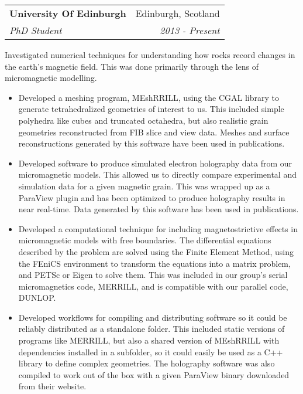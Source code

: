 \documentclass[11pt]{article}
\makeatletter
\newenvironment{resumeSubSectionHeader}{
    \par
    \begin{tabular*}{\textwidth}{l@{\extracolsep{\fill}}r}
    \par
} {
    \end{tabular*}
    \par
}
\newenvironment{resumeSubSectionBody}{
    \par
    \vspace{-0.8\parskip}
    \begin{small}
    \par
} {
    \par
    \end{small}
    \par
}
\makeatother
\begin{document}
%
%
\begin{resumeSubSectionHeader}

    \textbf{University Of Edinburgh}   & Edinburgh, Scotland \\
    \emph{PhD Student}                 & \emph{2013 - Present}

\end{resumeSubSectionHeader}
\begin{resumeSubSectionBody}

    Investigated numerical techniques for understanding how rocks record
    changes in the earth's magnetic field. This was done primarily through
    the lens of micromagnetic modelling.

    \begin{itemize}
        \item
            Developed a meshing program, MEshRRILL, using the CGAL library to
            generate tetrahedralized geometries of interest to us. This included
            simple polyhedra like cubes and truncated octahedra, but also
            realistic grain geometries reconstructed from FIB slice and view
            data. Meshes and surface reconstructions generated by this
            software have been used in publications.

        \item
            Developed software to produce simulated electron holography data
            from our micromagnetic models. This allowed us to directly compare
            experimental and simulation data for a given magnetic grain. This
            was wrapped up as a ParaView plugin and has been optimized to
            produce holography results in near real-time.
            Data generated by this software has been used in publications.

        \item
            Developed a computational technique for including magnetostrictive
            effects in micromagnetic models with free boundaries.
            The differential equations described by the problem are solved
            using the Finite Element Method, using the FEniCS environment
            to transform the equations into a matrix problem, and
            PETSc or Eigen to solve them.
            This was included in our group's serial micromagnetics code, MERRILL,
            and is compatible with our parallel code, DUNLOP.

        \item
            Developed workflows for compiling and distributing software so
            it could be reliably distributed as a standalone folder. This
            included static versions of programs like MERRILL, but also
            a shared version of MEshRRILL with dependencies installed in a
            subfolder, so it could easily be used as a C++ library to
            define complex geometries. The holography software was also compiled
            to work out of the box with a given ParaView binary downloaded
            from their website.
    \end{itemize}

\end{resumeSubSectionBody}
\end{document}
